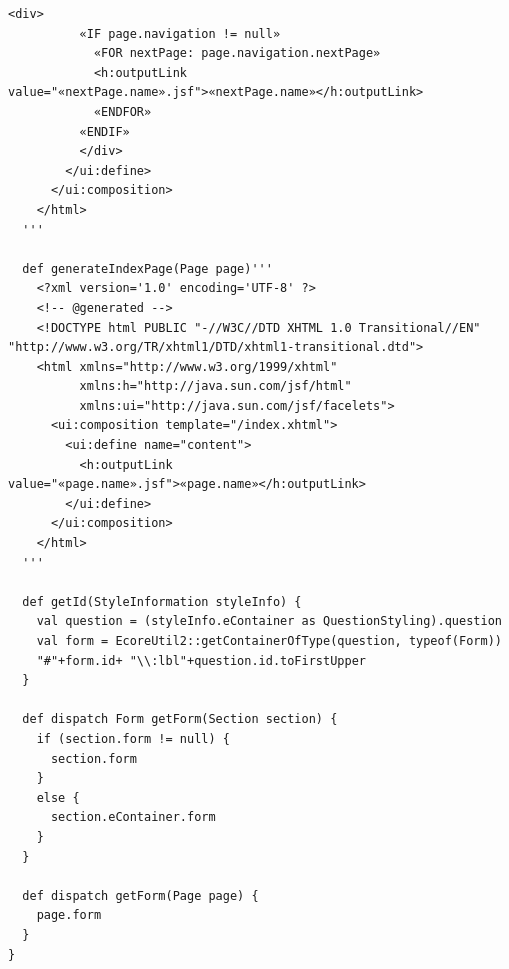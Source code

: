 \begin{lstlisting}[language=Xtend]
	  	  <div>
	  	  «IF page.navigation != null»
	  	    «FOR nextPage: page.navigation.nextPage»
	  	    <h:outputLink value="«nextPage.name».jsf">«nextPage.name»</h:outputLink>
	  	    «ENDFOR»
	  	  «ENDIF»
		  </div>
	    </ui:define>
	  </ui:composition>
	</html>
  '''
    
  def generateIndexPage(Page page)'''
	<?xml version='1.0' encoding='UTF-8' ?>
	<!-- @generated -->
	<!DOCTYPE html PUBLIC "-//W3C//DTD XHTML 1.0 Transitional//EN" "http://www.w3.org/TR/xhtml1/DTD/xhtml1-transitional.dtd">
	<html xmlns="http://www.w3.org/1999/xhtml"
	      xmlns:h="http://java.sun.com/jsf/html"
	      xmlns:ui="http://java.sun.com/jsf/facelets">
	  <ui:composition template="/index.xhtml">
	    <ui:define name="content">
	      <h:outputLink value="«page.name».jsf">«page.name»</h:outputLink>
	    </ui:define>
	  </ui:composition>
	</html>
  '''	
	
  def getId(StyleInformation styleInfo) {
    val question = (styleInfo.eContainer as QuestionStyling).question
    val form = EcoreUtil2::getContainerOfType(question, typeof(Form))
    "#"+form.id+ "\\:lbl"+question.id.toFirstUpper
  }

  def dispatch Form getForm(Section section) {
    if (section.form != null) {
      section.form
    }
    else {
      section.eContainer.form
    }
  }
	
  def dispatch getForm(Page page) {
    page.form
  }
}

\end{lstlisting}
